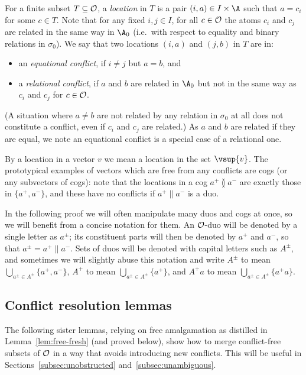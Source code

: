 For a finite subset $T \subseteq \cal O$, a {\em location} in $T$ is a pair $(i,a)\in I\times\A$ such that $a=c_i$ for some $c\in T$. 
Note that for any fixed $i,j\in I$, for all $c\in\cal O$ the atoms $c_i$ and $c_j$ are related in the same way in $\A_0$ (i.e.~with respect to equality and binary relations in $\sigma_0$). We say that two locations $(i,a)$ and $(j,b)$ in $T$ are in:
\begin{itemize}
\item an {\em equational conflict}, if $i\neq j$ but $a=b$, and
\item a {\em relational conflict}, if $a$ and $b$ are related in $\A_0$ but not in the same way as $c_i$ and $c_j$ for $c\in\cal O$.
\end{itemize}
(A situation where $a \neq b$ are not related by any relation in $\sigma_0$ at all does not constitute a conflict, even if $c_i$ and $c_j$ are related.) 
As $a$ and $b$ are related if they are equal, we note an equational conflict is a special case of a relational one.

By a location in a vector $v$ we mean a location in the set $\vsup{v}$.
The prototypical examples of vectors which are free from any conflicts are cogs (or any subvectors of cogs): 
note that the locations in a cog $a^+ \between a^-$ are exactly those in $\{a^+ ,a^-\}$, and these have no conflicts if $a^+ \parallel a^-$ is a duo.

In the following proof we will often manipulate many duos and cogs at once, 
so we will benefit from a concise notation for them. 
An $\cal O$-duo will be denoted by a single letter as $a^\pm$; 
its constituent parts will then be denoted by $a^+$ and $a^-$, 
so that $a^\pm=a^+\parallel a^-$. 
Sets of duos will be denoted with capital letters such as $A^\pm$, 
and sometimes we will slightly abuse this notation and write 
$A^\pm$ to mean $\bigcup_{a^\pm\in A^\pm}\{a^+,a^-\}$,
$A^+$ to mean $\bigcup_{a^\pm\in A^\pm}\{a^+\}$, 
and $A^+ a$ to mean $\bigcup_{a^\pm\in A^\pm}\{a^+ a\}$.

\subsection{Conflict resolution lemmas}
The following sister lemmas, relying on free amalgamation as distilled in Lemma~\ref{lem:free-fresh} (and proved below), show how to merge conflict-free subsets of $\cal O$ in a way that avoids introducing new conflicts. 
This will be useful in Sections~\ref{subsec:unobstructed} and~\ref{subsec:unambiguous}.

